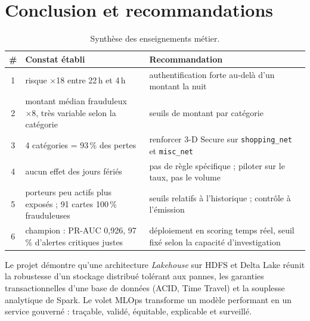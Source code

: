 \documentclass[11pt,a4paper]{article}
\newcommand{\code}[1]{\texttt{\small #1}}
\begin{document}
\section{Conclusion et recommandations}

\begin{table}[H]
\centering\small
\begin{tabularx}{\linewidth}{@{}c Y Y@{}}
\toprule
\textbf{\#} & \textbf{Constat établi} & \textbf{Recommandation} \\  & risque ×18 entre 22\,h et 4\,h & authentification forte au-delà d'un montant la nuit \\
2 & montant médian frauduleux ×8, très variable selon la catégorie & seuils de montant par catégorie \\
3 & 4 catégories = 93\,\% des pertes & renforcer 3-D Secure sur \code{shopping\_net} et \code{misc\_net} \\
4 & aucun effet des jours fériés & pas de règle spécifique ; piloter sur le taux, pas le volume \\
5 & porteurs peu actifs plus exposés ; 91 cartes 100\,\% frauduleuses & seuils relatifs à l'historique ; contrôle à l'émission \\
6 & champion : PR-AUC 0,926, 97\,\% d'alertes critiques justes & déploiement en scoring temps réel, seuil fixé selon la capacité d'investigation \\
\bottomrule
\end{tabularx}
\caption{Synthèse des enseignements métier.}
\end{table}

Le projet démontre qu'une architecture \emph{Lakehouse} sur HDFS et Delta Lake réunit la robustesse d'un stockage distribué tolérant
aux pannes, les garanties transactionnelles d'une base de données (ACID, Time Travel) et la souplesse analytique de Spark. Le volet
MLOps transforme un modèle performant en un service gouverné : traçable, validé, équitable, explicable et surveillé.
\end{document}
